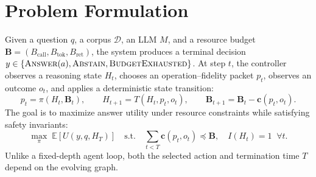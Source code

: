 \section{Problem Formulation}

Given a question $q$, a corpus $\mathcal{D}$, an LLM $M$, and a resource budget $\mathbf{B}=(B_{\mathrm{call}},B_{\mathrm{tok}},B_{\mathrm{ret}})$, the system produces a terminal decision $y\in\{\textsc{Answer}(a),\textsc{Abstain},\textsc{BudgetExhausted}\}$. At step $t$, the controller observes a reasoning state $H_t$, chooses an operation--fidelity packet $p_t$, observes an outcome $o_t$, and applies a deterministic state transition:
\begin{equation}
  p_t=\pi(H_t,\mathbf{B}_t),\qquad H_{t+1}=T(H_t,p_t,o_t),\qquad \mathbf{B}_{t+1}=\mathbf{B}_t-\mathbf{c}(p_t,o_t).
\end{equation}
The goal is to maximize answer utility under resource constraints while satisfying safety invariants:
\begin{equation}
\max_{\pi}\;\mathbb{E}\!\left[U(y,q,H_T)\right]
\quad\text{s.t.}\quad \sum_{t<T}\mathbf{c}(p_t,o_t)\preceq\mathbf{B},\quad I(H_t)=1\;\;\forall t.
\end{equation}
Unlike a fixed-depth agent loop, both the selected action and termination time $T$ depend on the evolving graph.
